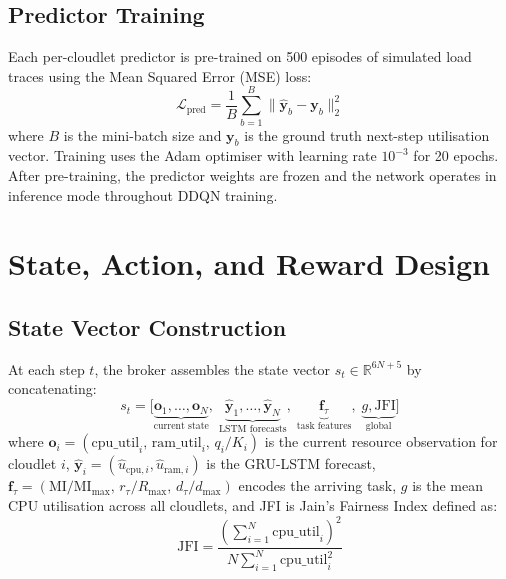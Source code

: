 \subsection{Predictor Training}

Each per-cloudlet predictor is pre-trained on 500 episodes of
simulated load traces using the Mean Squared Error (MSE) loss:
\begin{equation}
  \mathcal{L}_{\text{pred}}
  = \frac{1}{B} \sum_{b=1}^{B}
    \bigl\| \hat{\mathbf{y}}_b - \mathbf{y}_b \bigr\|_2^2
  \label{eq:pred_loss}
\end{equation}
where $B$ is the mini-batch size and $\mathbf{y}_b$ is the ground
truth next-step utilisation vector. Training uses the Adam
optimiser with learning rate $10^{-3}$ for 20 epochs. After
pre-training, the predictor weights are frozen and the network
operates in inference mode throughout DDQN training.

\section{State, Action, and Reward Design}
\label{sec:sar}

\subsection{State Vector Construction}

At each step $t$, the broker assembles the state vector
$s_t \in \mathbb{R}^{6N+5}$ by concatenating:
\begin{equation}
  s_t = \bigl[
    \underbrace{\mathbf{o}_1, \ldots, \mathbf{o}_N}_{\text{current state}},\;
    \underbrace{\hat{\mathbf{y}}_1, \ldots, \hat{\mathbf{y}}_N}_{\text{LSTM forecasts}},\;
    \underbrace{\mathbf{f}_\tau}_{\text{task features}},\;
    \underbrace{g, \text{JFI}}_{\text{global}}
  \bigr]
  \label{eq:state_vec}
\end{equation}
where $\mathbf{o}_i = (\text{cpu\_util}_i,\, \text{ram\_util}_i,\,
q_i / K_i)$ is the current resource observation for cloudlet $i$,
$\hat{\mathbf{y}}_i = (\hat{u}_{\text{cpu},i},
\hat{u}_{\text{ram},i})$ is the GRU-LSTM forecast,
$\mathbf{f}_\tau = (\text{MI}/\text{MI}_{\max},\,
r_\tau/R_{\max},\, d_\tau/d_{\max})$ encodes the arriving task,
$g$ is the mean CPU utilisation across all cloudlets, and JFI is
Jain's Fairness Index defined as:
\begin{equation}
  \text{JFI} = \frac{\left(\sum_{i=1}^{N}
    \text{cpu\_util}_i\right)^2}
    {N \sum_{i=1}^{N} \text{cpu\_util}_i^2}
  \label{eq:jfi}
\end{equation}

